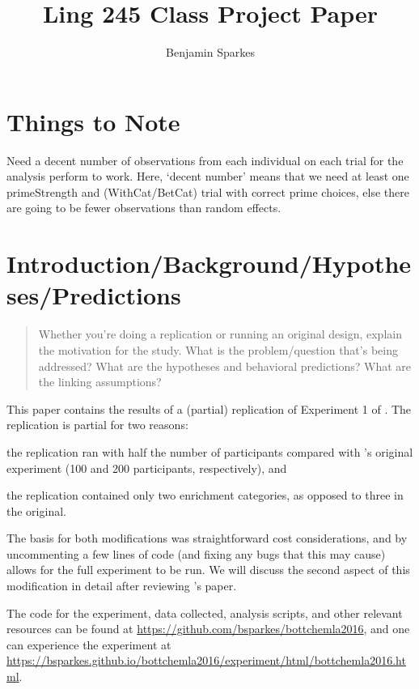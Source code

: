 \documentclass[10pt]{article}
\title{Ling 245 Class Project Paper}
\author{Benjamin Sparkes}
\begin{document}
\maketitle

\begin{multicols}{2}

  \section{Things to Note}
\label{sec:things-note}

Need a decent number of observations from each individual on each trial for the analysis \citeauthor{Bott:2016aa} perform to work.
Here, `decent number' means that we need at least one primeStrength and (WithCat/BetCat) trial with correct prime choices, else there are going to be fewer observations than random effects.

\section{Introduction/Background/Hypotheses/Predictions}
\label{sec:introduction}

\begin{quote}
  Whether you're doing a replication or running an original design, explain the motivation for the study.
  What is the problem/question that's being addressed?
  What are the hypotheses and behavioral predictions?
  What are the linking assumptions?
\end{quote}

This paper contains the results of a (partial) replication of Experiment 1 of \textcite{Bott:2016aa}.
The replication is partial for two reasons:
\begin{enumerate*}[label=\arabic*)]
\item the replication ran with half the number of participants compared with \citeauthor{Bott:2016aa}'s original experiment (100 and 200 participants, respectively), and
\item the replication contained only two enrichment categories, as opposed to three in the original.
\end{enumerate*}
The basis for both modifications was straightforward cost considerations, and by uncommenting a few lines of code (and fixing any bugs that this may cause) allows for the full experiment to be run.
We will discuss the second aspect of this modification in detail after reviewing \citeauthor{Bott:2016aa}'s paper.

The code for the experiment, data collected, analysis scripts, and other relevant resources can be found at \url{https://github.com/bsparkes/bottchemla2016}, and one can experience the experiment at \url{https://bsparkes.github.io/bottchemla2016/experiment/html/bottchemla2016.html}.







\end{multicols}
\end{document}
